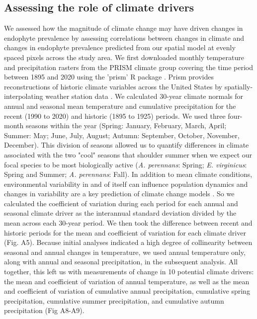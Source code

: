 \documentclass[11pt]{article}
\begin{document}
		\subsection*{Assessing the role of climate drivers}
		
We assessed how the magnitude of climate change may have driven changes in endophyte prevalence by assessing correlations between changes in climate and changes in endophyte prevalence predicted from our spatial model at evenly spaced pixels across the study area. 
We first downloaded monthly temperature and precipitation rasters from the PRISM climate group \citep{daly2013prism} covering the time period between 1895 and 2020 using the 'prism' R package \citep{Rprism2015}. 
Prism provides reconstructions of historic climate variables across the United States by spatially-interpolating weather station data \citep{diLuzio2008constructing}. 
We calculated 30-year climate normals for annual and seasonal mean temperature and cumulative precipitation for the recent (1990 to 2020) and historic (1895 to 1925) periods.
We used three four-month seasons within the year (Spring: January, February, March, April; Summer: May; June, July, August; Autumn: September, October, November, December). 
This division of seasons allowed us to quantify differences in climate associated with the two "cool" seasons  that shoulder summer when we expect our focal species to be most biologically active (\emph{A. perennans}: Spring; \emph{E. virginicus}: Spring and Summer; \emph{A. perennans}: Fall). 
In addition to mean climate conditions, environmental variability  in and of itself can influence population dynamics \cite{tuljapurkar_population_1982} and changes in variability are a key prediction of climate change models \cite{stocker2013technical, ipcc_2021}.
So we calculated the coefficient of variation during each period for each annual and seasonal climate driver as the interannual standard deviation divided by the mean across each 30-year period.
We then took the difference between recent and historic periods for the mean and coefficient of variation for each climate driver (Fig. A5).
Because initial analyses indicated a high degree of collinearity between seasonal and annual changes in temperature, we used annual temperature only, along with annual and seasonal precipitation, in the subsequent analysis.
All together, this left us with measurements of change in 10 potential climate drivers: the mean and coefficient of variation of annual temperature, as well as the mean and coefficient of variation of cumulative annual precipitation, cumulative spring precipitation, cumulative summer precipitation, and cumulative autumn precipitation (Fig A8-A9).
\end{document}
